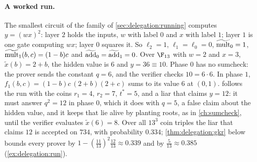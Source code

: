 \begin{refsection}
\paragraph{A worked run.} The smallest circuit of the family of \cref{sec:delegation:running} computes $y=(wx)^2$: layer $2$ holds the inputs, $w$ with label $0$ and $x$ with label $1$; layer $1$ is one gate computing $wx$; layer $0$ squares it. So $\ell_2=1$, $\ell_1=\ell_0=0$, $\widetilde{\mathrm{mult}}_0=1$, $\widetilde{\mathrm{mult}}_1(b,c)=(1-b)c$ and $\widetilde{\mathrm{add}}_0=\widetilde{\mathrm{add}}_1=0$. Over $\F_{13}$ with $w=2$ and $x=3$, $\tilde x(b)=2+b$, the hidden value is $6$ and $y=36\equiv10$. Phase $0$ has no sumcheck: the prover sends the constant $q=6$, and the verifier checks $10=6\cdot6$. In phase $1$, $f_1(b,c)=(1-b)c\,(2+b)(2+c)$ sums to its value $6$ at $(0,1)$.  follows the run with the coins $r_1=4$, $r_2=7$, $t^*=5$, and a liar that claims $y=12$: it must answer $q^2=12$ in phase $0$, which it does with $q=5$, a false claim about the hidden value, and it keeps that lie alive by planting roots, as in \cref{ch:sumcheck}, until the verifier evaluates $\tilde x(6)=8$. Over all $13^3$ coin triples the liar that claims $12$ is accepted on $734$, with probability $0.334$; \cref{thm:delegation:gkr} below bounds every prover by $1-(\frac{11}{13})^2\frac{12}{13}\approx0.339$ and by $\frac5{13}\approx0.385$ (\cref{ex:delegation:run}).


\end{refsection}
